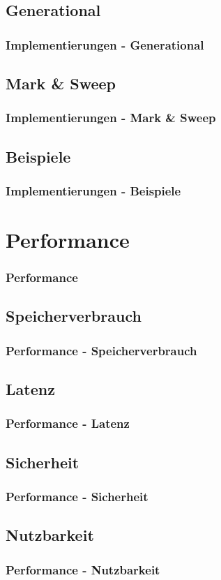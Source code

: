 \documentclass{beamer}
\begin{document}
        \subsection{Generational}
            \begin{frame}
                \frametitle{Implementierungen - Generational}
            \end{frame}

        \subsection{Mark \& Sweep}
            \begin{frame}
                \frametitle{Implementierungen - Mark \& Sweep}
            \end{frame}

        \subsection{Beispiele}
            \begin{frame}
                \frametitle{Implementierungen - Beispiele}
            \end{frame}

    \section{Performance}
        \begin{frame}
            \frametitle{Performance}
        \end{frame}

        \subsection{Speicherverbrauch}
            \begin{frame}
                \frametitle{Performance - Speicherverbrauch}
            \end{frame}

        \subsection{Latenz}
            \begin{frame}
                \frametitle{Performance - Latenz}
            \end{frame}

        \subsection{Sicherheit}
            \begin{frame}
                \frametitle{Performance - Sicherheit}
            \end{frame}

        \subsection{Nutzbarkeit}
            \begin{frame}
                \frametitle{Performance - Nutzbarkeit}
            \end{frame}
\end{document}
